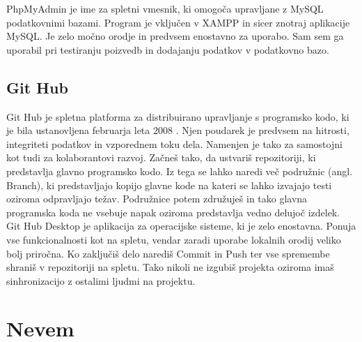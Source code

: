\documentclass[a4paper, 12pt]{book}
\begin{document}
PhpMyAdmin je ime za spletni vmesnik, ki omogoča upravljane z MySQL podatkovnimi bazami. Program je vključen v XAMPP in sicer znotraj aplikacije MySQL. Je zelo močno orodje in predvsem enostavno za uporabo. Sam sem ga uporabil pri testiranju poizvedb in dodajanju podatkov v podatkovno bazo.

\section {Git Hub}
Git Hub je spletna platforma za distribuirano upravljanje s programsko kodo, ki je bila ustanovljena februarja leta 2008 \cite{GitHub}. Njen poudarek je predvsem na hitrosti, integriteti podatkov in vzporednem toku dela. Namenjen je tako za samostojni kot tudi za kolaborantovi razvoj. Začneš tako, da ustvariš repozitoriji, ki predstavlja glavno programsko kodo. Iz tega se lahko naredi več podružnic (angl. Branch), ki predstavljajo kopijo glavne kode na kateri se lahko izvajajo testi oziroma odpravljajo težav. Podružnice potem združuješ in tako glavna programska koda ne vsebuje napak oziroma predstavlja vedno delujoč izdelek.
Git Hub Desktop je aplikacija za operacijske sisteme, ki je zelo enostavna. Ponuja vse funkcionalnosti kot na spletu, vendar zaradi uporabe lokalnih orodij veliko bolj priročna. Ko zaključiš delo narediš Commit in Push ter vse spremembe shraniš v repozitoriji na spletu. Tako nikoli ne izgubiš projekta oziroma imaš sinhronizacijo z ostalimi ljudmi na projektu. 

\chapter {Nevem}
\end{document}
